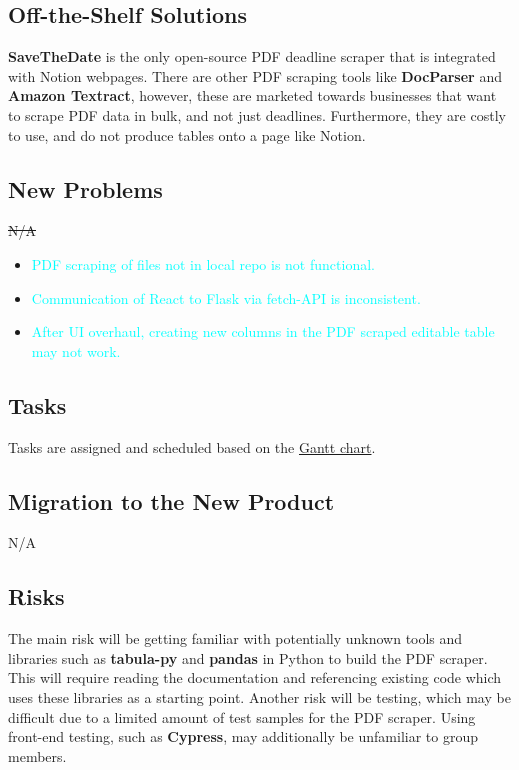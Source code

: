 \documentclass[12pt, titlepage]{article}
\begin{document}
\subsection{Off-the-Shelf Solutions}
\textbf{SaveTheDate} is the only open-source PDF deadline scraper that is integrated with Notion webpages. There are other PDF scraping tools like \textbf{DocParser} and 
\textbf{Amazon Textract}, however, these are marketed towards businesses that want to scrape PDF data in bulk, and not just deadlines. Furthermore, they are costly to use, and do not produce tables onto a page like Notion.

\subsection{New Problems}
\sout{N/A}

\begin{itemize}
  \item \textcolor{cyan}{PDF scraping of files not in local repo is not functional.}
  \item \textcolor{cyan}{Communication of React to Flask via fetch-API is inconsistent.}
  \item \textcolor{cyan}{After UI overhaul, creating new columns in the PDF scraped editable table may
  not work.}
\end{itemize}

\subsection{Tasks}
Tasks are assigned and scheduled based on the \href{https://gitlab.cas.mcmaster.ca/se3xa3_l03_g17/se3xa3_l03_g17/-/blob/main/ProjectSchedule/3XA3_L03_G17_GanttChart.pdf}{Gantt chart}.

\subsection{Migration to the New Product}
N/A

\subsection{Risks}
The main risk will be getting familiar with potentially unknown tools and libraries such as \textbf{tabula-py} and \textbf{pandas} in Python to build the PDF scraper. This will require reading the documentation and referencing existing code which uses these libraries as a starting point. Another risk will be testing, which may be difficult due to a limited amount of test samples for  the PDF scraper. Using front-end testing, such as \textbf{Cypress}, may additionally be unfamiliar to group members.
\end{document}
